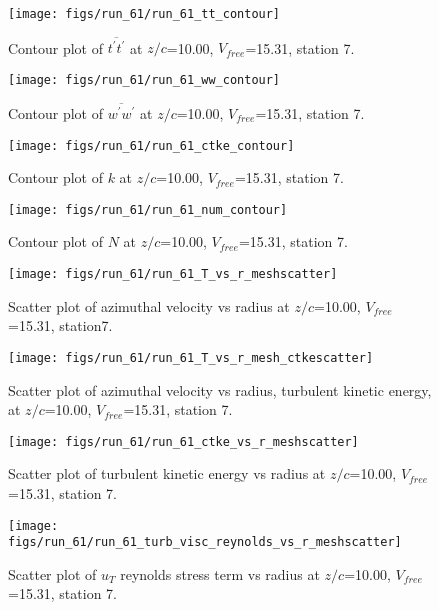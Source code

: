 \begin{figure}[H]
\centering
\texttt{[image: figs/run\_61/run\_61\_tt\_contour]}
\caption{Contour plot of $\overline{t^\prime t^\prime}$ at $z/c$=10.00, $V_{free}$=15.31, station 7.}
\end{figure}


\begin{figure}[H]
\centering
\texttt{[image: figs/run\_61/run\_61\_ww\_contour]}
\caption{Contour plot of $\overline{w^\prime w^\prime}$ at $z/c$=10.00, $V_{free}$=15.31, station 7.}
\end{figure}


\begin{figure}[H]
\centering
\texttt{[image: figs/run\_61/run\_61\_ctke\_contour]}
\caption{Contour plot of $k$ at $z/c$=10.00, $V_{free}$=15.31, station 7.}
\end{figure}


\begin{figure}[H]
\centering
\texttt{[image: figs/run\_61/run\_61\_num\_contour]}
\caption{Contour plot of $N$ at $z/c$=10.00, $V_{free}$=15.31, station 7.}
\end{figure}


\begin{figure}[H]
\centering
\texttt{[image: figs/run\_61/run\_61\_T\_vs\_r\_meshscatter]}
\caption{Scatter plot of azimuthal velocity vs radius at $z/c$=10.00, $V_{free}$=15.31, station7.}
\end{figure}


\begin{figure}[H]
\centering
\texttt{[image: figs/run\_61/run\_61\_T\_vs\_r\_mesh\_ctkescatter]}
\caption{Scatter plot of azimuthal velocity vs radius, turbulent kinetic energy, at $z/c$=10.00, $V_{free}$=15.31, station 7.}
\end{figure}


\begin{figure}[H]
\centering
\texttt{[image: figs/run\_61/run\_61\_ctke\_vs\_r\_meshscatter]}
\caption{Scatter plot of turbulent kinetic energy vs radius at $z/c$=10.00, $V_{free}$=15.31, station 7.}
\end{figure}


\begin{figure}[H]
\centering
\texttt{[image: figs/run\_61/run\_61\_turb\_visc\_reynolds\_vs\_r\_meshscatter]}
\caption{Scatter plot of $
u_T$ reynolds stress term vs radius at $z/c$=10.00, $V_{free}$=15.31, station 7.}
\end{figure}


